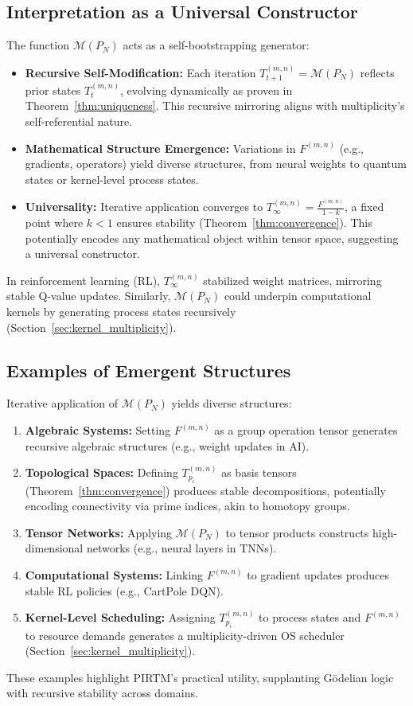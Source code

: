 \documentclass{article}
\theoremstyle{plain}
\begin{document}
\subsection{Interpretation as a Universal Constructor}
The function \(\mathcal{M}(P_N)\) acts as a self-bootstrapping generator:
\begin{itemize}
    \item \textbf{Recursive Self-Modification:} Each iteration \(T_{t+1}^{(m,n)} = \mathcal{M}(P_N)\) reflects prior states \(T_t^{(m,n)}\), evolving dynamically as proven in Theorem~\ref{thm:uniqueness}. This recursive mirroring aligns with multiplicity’s self-referential nature.
    \item \textbf{Mathematical Structure Emergence:} Variations in \(F^{(m,n)}\) (e.g., gradients, operators) yield diverse structures, from neural weights to quantum states or kernel-level process states.
    \item \textbf{Universality:} Iterative application converges to \(T_\infty^{(m,n)} = \frac{F^{(m,n)}}{1 - k}\), a fixed point where \(k < 1\) ensures stability (Theorem~\ref{thm:convergence}). This potentially encodes any mathematical object within tensor space, suggesting a universal constructor.
\end{itemize}
In reinforcement learning (RL), \(T_\infty^{(m,n)}\) stabilized weight matrices, mirroring stable Q-value updates. Similarly, \(\mathcal{M}(P_N)\) could underpin computational kernels by generating process states recursively (Section~\ref{sec:kernel_multiplicity}).

\subsection{Examples of Emergent Structures}
Iterative application of \(\mathcal{M}(P_N)\) yields diverse structures:
\begin{enumerate}
    \item \textbf{Algebraic Systems:} Setting \(F^{(m,n)}\) as a group operation tensor generates recursive algebraic structures (e.g., weight updates in AI).
    \item \textbf{Topological Spaces:} Defining \(T_{p_i}^{(m,n)}\) as basis tensors (Theorem~\ref{thm:convergence}) produces stable decompositions, potentially encoding connectivity via prime indices, akin to homotopy groups.
    \item \textbf{Tensor Networks:} Applying \(\mathcal{M}(P_N)\) to tensor products constructs high-dimensional networks (e.g., neural layers in TNNs).
    \item \textbf{Computational Systems:} Linking \(F^{(m,n)}\) to gradient updates produces stable RL policies (e.g., CartPole DQN).
    \item \textbf{Kernel-Level Scheduling:} Assigning \(T_{p_i}^{(m,n)}\) to process states and \(F^{(m,n)}\) to resource demands generates a multiplicity-driven OS scheduler (Section~\ref{sec:kernel_multiplicity}).
\end{enumerate}
These examples highlight PIRTM’s practical utility, supplanting Gödelian logic with recursive stability across domains.
\end{document}
